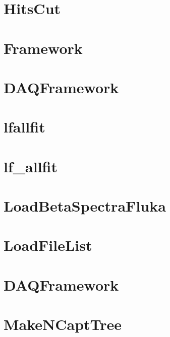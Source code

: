 \let\mypdfximage\pdfximage\def\pdfximage{\immediate\mypdfximage}\documentclass[twoside]{book}
\newcommand{\+}{\discretionary{\mbox{\scriptsize$\hookleftarrow$}}{}{}}
\begin{document}
\chapter{Hits\+Cut}
\label{md_UserTools_IDHitsCut_README}

\chapter{Framework}
\label{md_UserTools_ImportedTools_README}

\chapter{DAQFramework}
\label{md_UserTools_InactiveTools_README}

\chapter{lfallfit}
\label{md_UserTools_lfallfit_README}

\chapter{lf\+\_\+allfit}
\label{md_UserTools_lfallfit_simple_README}

\chapter{Load\+Beta\+Spectra\+Fluka}
\label{md_UserTools_LoadBetaSpectraFluka_README}

\chapter{Load\+File\+List}
\label{md_UserTools_LoadFileList_README}

\chapter{DAQFramework}
\label{md_UserTools_LoadSubTrigger_README}

\chapter{Make\+NCapt\+Tree}
\label{md_UserTools_MakeNCaptTree_README}

\end{document}
